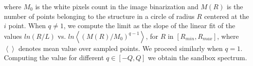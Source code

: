 \documentclass[spanish,a4paper,openright,11pt]{book}
\begin{document}
\noindent where $M_{0}$ is the white pixels count in the image binarization and  $M(R)$ is the number of points belonging to the structure in a circle of radius $R$ centered at the $i$ point. When $q\ne1$, we compute the limit as the slope of the linear fit of the values $ln(R/L)$ vs. $ ln  \left\langle  { (M(R)/M_{0})^{q-1}  }  \right\rangle$, for $R$ in $[R_{min}, R_{max}]$, where $ \left\langle   \right\rangle$ denotes mean value over sampled points. We proceed similarly when $q=1$. Computing the value for different $q \in [-Q,Q]$  we obtain the sandbox spectrum.


\end{document}
